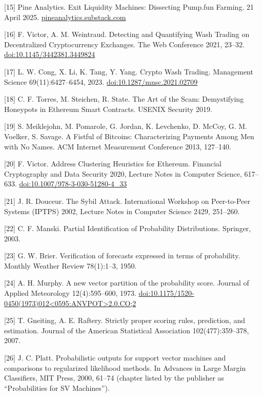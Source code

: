 {[}15{]} Pine Analytics. Exit Liquidity Machines: Dissecting Pump.fun Farming. 21 April 2025. \href{https://pineanalytics.substack.com/p/exit-liquidity-machines}{pineanalytics.substack.com}

{[}16{]} F. Victor, A. M. Weintraud. Detecting and Quantifying Wash Trading on Decentralized Cryptocurrency Exchanges. The Web Conference 2021, 23--32. \href{https://doi.org/10.1145/3442381.3449824}{doi:10.1145/3442381.3449824}

{[}17{]} L. W. Cong, X. Li, K. Tang, Y. Yang. Crypto Wash Trading. Management Science 69(11):6427--6454, 2023. \href{https://doi.org/10.1287/mnsc.2021.02709}{doi:10.1287/mnsc.2021.02709}

{[}18{]} C. F. Torres, M. Steichen, R. State. The Art of the Scam: Demystifying Honeypots in Ethereum Smart Contracts. USENIX Security 2019.

{[}19{]} S. Meiklejohn, M. Pomarole, G. Jordan, K. Levchenko, D. McCoy, G. M. Voelker, S. Savage. A Fistful of Bitcoins: Characterizing Payments Among Men with No Names. ACM Internet Measurement Conference 2013, 127--140.

{[}20{]} F. Victor. Address Clustering Heuristics for Ethereum. Financial Cryptography and Data Security 2020, Lecture Notes in Computer Science, 617--633. \href{https://doi.org/10.1007/978-3-030-51280-4_33}{doi:10.1007/978-3-030-51280-4\_33}

{[}21{]} J. R. Douceur. The Sybil Attack. International Workshop on Peer-to-Peer Systems (IPTPS) 2002, Lecture Notes in Computer Science 2429, 251--260.

{[}22{]} C. F. Manski. Partial Identification of Probability Distributions. Springer, 2003.

{[}23{]} G. W. Brier. Verification of forecasts expressed in terms of probability. Monthly Weather Review 78(1):1--3, 1950.

{[}24{]} A. H. Murphy. A new vector partition of the probability score. Journal of Applied Meteorology 12(4):595--600, 1973. \href{https://doi.org/10.1175/1520-0450(1973)012\%3C0595:ANVPOT\%3E2.0.CO;2}{doi:10.1175/1520-0450(1973)012\textless0595:ANVPOT\textgreater2.0.CO;2}

{[}25{]} T. Gneiting, A. E. Raftery. Strictly proper scoring rules, prediction, and estimation. Journal of the American Statistical Association 102(477):359--378, 2007.

{[}26{]} J. C. Platt. Probabilistic outputs for support vector machines and comparisons to regularized likelihood methods. In Advances in Large Margin Classifiers, MIT Press, 2000, 61--74 (chapter listed by the publisher as ``Probabilities for SV Machines'').

